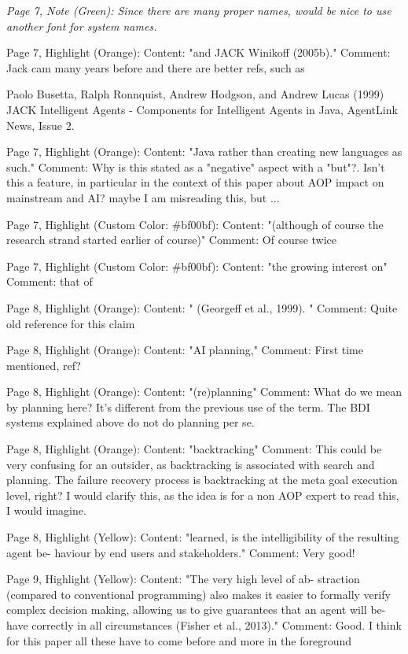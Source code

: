 \documentclass[12pt]{article}
\newenvironment{reviews}{\bigskip\itshape}{\upshape\bigskip}
\begin{document}
\begin{reviews}
Page 7, Note (Green):
Since there are many proper names, would be nice to use another font for system names.

Page 7, Highlight (Orange):
Content: "and JACK Winikoff (2005b)."
Comment: Jack cam many years before and there are better refs, such as 

Paolo Busetta, Ralph Ronnquist, Andrew Hodgson, and Andrew Lucas (1999) JACK Intelligent Agents - Components for Intelligent Agents in Java, AgentLink News, Issue 2.

Page 7, Highlight (Orange):
Content: "Java rather than creating new languages as such."
Comment: Why is this stated as a "negative" aspect with a "but"?. Isn't this a feature, in particular in the context of this paper about AOP impact on mainstream and AI? maybe I am misreading this, but ...

Page 7, Highlight (Custom Color: \#bf00bf):
Content: "(although of course the research strand started earlier of course)"
Comment: Of course twice

Page 7, Highlight (Custom Color: \#bf00bf):
Content: "the growing interest on"
Comment: that of

Page 8, Highlight (Orange):
Content: " (Georgeff et al., 1999). "
Comment: Quite old reference for this claim

Page 8, Highlight (Orange):
Content: "AI planning,"
Comment: First time mentioned, ref?

Page 8, Highlight (Orange):
Content: "(re)planning"
Comment: What do we mean by planning here? It's different from the previous use of the term. The BDI systems explained above do not do planning per se.

Page 8, Highlight (Orange):
Content: "backtracking"
Comment: This could be very confusing for an outsider, as backtracking is associated with search and planning. The failure recovery process is backtracking at the meta goal execution level, right? I would clarify this, as the idea is for a non AOP expert to read this, I would imagine.

Page 8, Highlight (Yellow):
Content: "learned, is the intelligibility of the resulting agent be- haviour by end users and stakeholders."
Comment: Very good!

Page 9, Highlight (Yellow):
Content: "The very high level of ab- straction (compared to conventional programming) also makes it easier to formally verify complex decision making, allowing us to give guarantees that an agent will be- have correctly in all circumstances (Fisher et al., 2013)."
Comment: Good. I think for this paper all these have to come before and more in the foreground 


\end{reviews}
\end{document}
